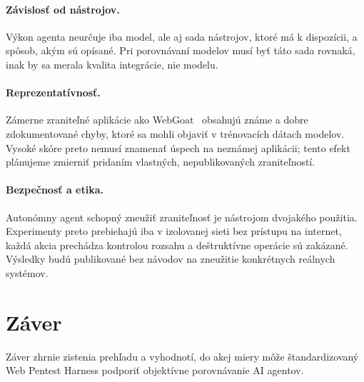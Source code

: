 \documentclass[10pt,twoside,slovak,a4paper]{article}
\begin{document}
\paragraph{Závislosť od nástrojov.} Výkon agenta neurčuje iba model, ale aj sada nástrojov, ktoré má k dispozícii, a spôsob, akým sú opísané. Pri porovnávaní modelov musí byť táto sada rovnaká, inak by sa merala kvalita integrácie, nie modelu.

\paragraph{Reprezentatívnosť.} Zámerne zraniteľné aplikácie ako WebGoat~\cite{OWASP-WebGoat} obsahujú známe a dobre zdokumentované chyby, ktoré sa mohli objaviť v trénovacích dátach modelov. Vysoké skóre preto nemusí znamenať úspech na neznámej aplikácii; tento efekt plánujeme zmierniť pridaním vlastných, nepublikovaných zraniteľností.

\paragraph{Bezpečnosť a etika.} Autonómny agent schopný zneužiť zraniteľnosť je nástrojom dvojakého použitia. Experimenty preto prebiehajú iba v izolovanej sieti bez prístupu na internet, každá akcia prechádza kontrolou rozsahu a deštruktívne operácie sú zakázané. Výsledky budú publikované bez návodov na zneužitie konkrétnych reálnych systémov.

\section{Záver}\label{zaver}
Záver zhrnie zistenia prehľadu a vyhodnotí, do akej miery môže štandardizovaný Web Pentest Harness podporiť objektívne porovnávanie AI agentov.



\end{document}
